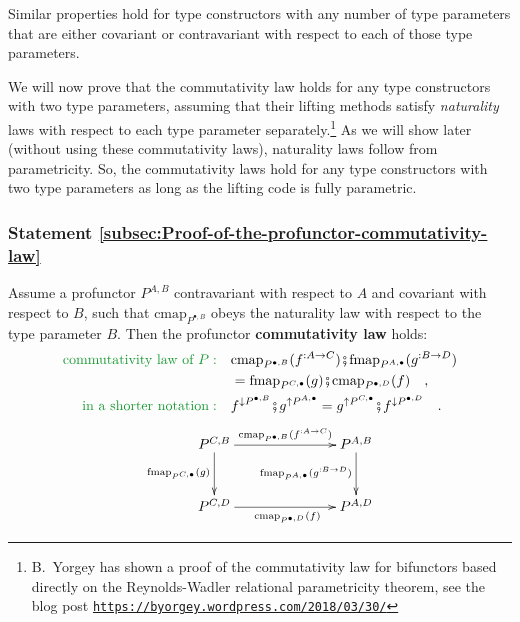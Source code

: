 Similar properties hold for type constructors with any number of type
parameters that are either covariant or contravariant with respect
to each of those type parameters.

We will now prove that the commutativity law holds for any type constructors
with two type parameters, assuming that their lifting methods satisfy
\emph{naturality} laws with respect to each type parameter separately.\footnote{B.~Yorgey has shown a proof of the commutativity law for bifunctors
based directly on the Reynolds-Wadler relational parametricity theorem,
see the blog post \texttt{\href{https://byorgey.wordpress.com/2018/03/30/}{https://byorgey.wordpress.com/2018/03/30/}} } As we will show later (without using these commutativity laws), naturality
laws follow from parametricity. So, the commutativity laws hold for
any type constructors with two type parameters as long as the lifting
code is fully parametric.

\subsubsection{Statement \label{subsec:Proof-of-the-profunctor-commutativity-law}\ref{subsec:Proof-of-the-profunctor-commutativity-law}}

Assume a profunctor $P^{A,B}$ contravariant with respect to $A$
and covariant with respect to $B$, such that $\text{cmap}_{P^{\bullet,B}}$
obeys the naturality law with respect to the type parameter $B$.
Then the profunctor \textbf{commutativity law}
holds:
\begin{align}
{\color{greenunder}\text{commutativity law of }P:}\quad & \text{cmap}_{P^{\bullet,B}}(f^{:A\rightarrow C})\bef\text{fmap}_{P^{A,\bullet}}(g^{:B\rightarrow D})\nonumber \\
 & =\text{fmap}_{P^{C,\bullet}}(g)\bef\text{cmap}_{P^{\bullet,D}}(f)\quad,\nonumber \\
{\color{greenunder}\text{in a shorter notation}:}\quad & f^{\downarrow P^{\bullet,B}}\bef g^{\uparrow P^{A,\bullet}}=g^{\uparrow P^{C,\bullet}}\bef f^{\downarrow P^{\bullet,D}}\quad.\label{eq:profunctor-commutativity-law}
\end{align}
\[
\xymatrix{\xyScaleY{2.5pc}\xyScaleX{6.0pc}P^{C,B}\ar[r]\sp(0.55){\text{cmap}_{P^{\bullet,B}}(f^{:A\rightarrow C})~~~}\ar[d]\sb(0.45){\text{fmap}_{P^{C,\bullet}}(g)} & P^{A,B}\ar[d]\sb(0.45){\text{fmap}_{P^{A,\bullet}}(g^{:B\rightarrow D})}\\
P^{C,D}\ar[r]\sb(0.45){~~~~\text{cmap}_{P^{\bullet,D}}(f)} & P^{A,D}
}
\]


